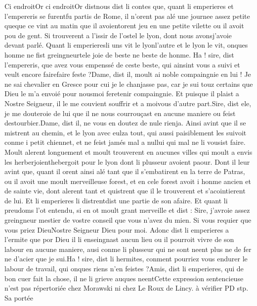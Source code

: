 \documentclass{article}
\begin{document}
\begin{pages}
            
\pstart Ci endroitOr ci 
   endroitOr 
   distnous dist li contes que, 
   quant li emperieres et l’empereris 
   se furentfu partis de Rome, 
   il n’orent pas alé une journee assez petite queque ce vint au matin que il 
   avoientorent jeu en une petite vilette ou il avoit pou de gent. 
   Si trouverent a l’issir de l’ostel le lyon, 
   dont nous avonsj'avoie devant parlé. 
   Quant li emperieresli uns vit 
   le lyonl'autre 
   et le lyon le vit, 
   onques honme ne fist greingneurtele joie de beste 
   ne beste de honme. 
   Ha ! sire, dist l’empereris, que avez vous empenssé de 
      ceste beste, qui ainsint vous a suivi et veult encore 
      fairefaire feste ?Dame, dist il, moult ai noble compaingnie en lui ! Je ne sai chevalier 
      en Gresce 
      pour cui je le chanjasse pas, car je sui touz certains que Dieu le 
      m’a envoié pour nousmoi 
      feretenir compaingnie. Et puisque il plaist a Nostre Seigneur, 
      il le me couvient souffrir et a moivous 
         d’autre part.Sire, dist ele, je me douteroie de lui que il ne nous courrouçast en aucune maniere ou feist destourbier.Dame, dist il, ne vous en doutez de nule rienja. \pend
\pstart Ainsi avint que il se mistrent au chemin, 
   et le lyon avec eulza tout, 
   qui aussi paisiblement les suivoit conme i petit chiennet, et ne feist jamés mal a nullui qui mal ne li vousist faire. 
   Moult alerent longuement et moult trouverent en aucunes villes qui moult a envis les 
   herberjoienthebergoit pour 
   le lyon dont li plusseur avoient paour. Dont il leur avint que, 
   quant il orent ainsi alé tant que il s’embatirent en la terre de Patras, 
   ou il avoit une moult merveilleuse forest, et en cele forest avoit 
   i honme ancien et de sainte vie, 
   dont alerent tant et quistrent que il le trouverent et s’acointierent de lui. 
   Et li emperieres li 
   distrentdist 
   une partie de son afaire. 
   Et quant li preudoms l’ot entendu, si en ot moult grant merveille et dist :
   Sire, j’avroie assez greingneur mestier de vostre conseil que vous n’avez du mien. 
      Si vous requier que vous priez DieuNostre Seigneur Dieu pour moi.
   Adonc dist li emperieres a l’ermite que 
   por Dieu il li enseingnast aucun lieu ou il pourroit vivre de son labour en aucune maniere,
   ausi conme li plusseur qui ne sont neent plus ne de fer ne d’acier que je sui.Ha ! sire, dist li hermites, 
   conment pourriez vous endurer le labour de travail, qui onques riens n’en feistes ?Amis, dist li emperieres, 
      qui de bon cuer fait la chose, il ne li grieve auques neentCette 
         expression sentencieuse n'est pas répertoriée chez Morawski ni chez Le Roux de Lincy. à vérifier PD stp. Sa portée 

\end{pages}
\end{document}
